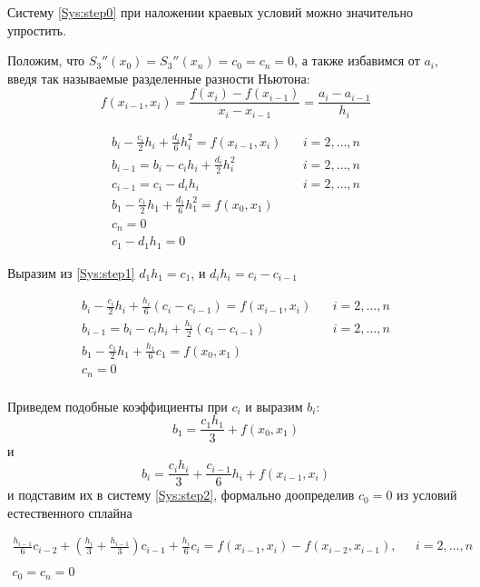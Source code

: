 Систему \eqref{Sys:step0} при наложении краевых условий можно значительно упростить.

Положим, что $S_3''(x_0) = S_3''(x_n) = c_0 = c_n = 0$, а также избавимся от $a_i$, введя так называемые разделенные разности Ньютона:
$$f(x_{i-1}, x_i) = \frac{f(x_i) - f(x_{i-1})}{x_i - x_{i-1}} = \frac{a_i - a_{i-1}}{h_i}$$

\begingroup
\Large
\begin{equation}
\begin{array}{lr}
     b_i - \frac{c_i}{2}h_i + \frac{d_i}{6}h_i^2= f(x_{i-1}, x_i)\ \ \ \  & i = 2,\dots, n  \\
     b_{i-1} = b_i - c_i h_i +\frac{d_i}{2}h_i^2 & i = 2,\dots, n  \\
     c_{i-1} = c_i - d_i h_i & i = 2,\dots, n  \\
     b_1 - \frac{c_1}{2} h_1 + \frac{d_1}{6} h_1^2 = f(x_0,x_1)
     & \\
     c_n = 0 & \\
     c_1 - d_1 h_1 = 0 &
\end{array}
\label{Sys:step1}
\end{equation}
\endgroup

Выразим из \eqref{Sys:step1} $d_1 h_1 = c_1$, и $d_i h_i = c_i - c_{i -1}$

\begingroup
\Large
\begin{equation}
\begin{array}{lr}
     b_i - \frac{c_i}{2}h_i + \frac{h_i}{6}(c_i - c_{i-1})= f(x_{i-1}, x_i)\ \ \ \  & i = 2,\dots, n  \\
     b_{i-1} = b_i - c_i h_i +\frac{h_i}{2}(c_i - c_{i-1}) & i = 2,\dots, n  \\
     b_1 - \frac{c_1}{2} h_1 + \frac{h_1}{6} c_1 = f(x_0,x_1)
     & \\
     c_n = 0 & \\
\end{array}
\label{Sys:step2}
\end{equation}
\endgroup

Приведем подобные коэффициенты при $c_i$ и выразим $b_i$: $$b_1 = \frac{c_1 h_1}{3} + f(x_0,x_1)$$ и $$b_i = \frac{c_i h_i}{3} + \frac{c_{i-1}}{6} h_i + f(x_{i-1}, x_i)$$ и подставим их в систему \eqref{Sys:step2}, формально доопределив $c_0 = 0$ из условий естественного сплайна 

\begin{equation}
\begin{array}{lr}
    \frac{h_{i-1}}{6}c_{i-2} + (\frac{h_i}{3} + \frac{h_{i-1}}{3}) c_{i-1} + \frac{h_i}{6}c_i = f(x_{i-1},x_i) - f(x_{i-2}, x_{i-1}),\ \ \ & i = 2,\dots,n \\
    & \\
    c_0 = c_n = 0 &
\end{array}
\label{Sys:step3}
\end{equation}


